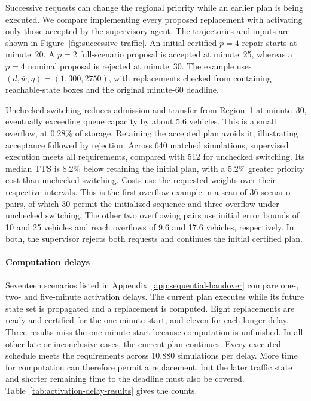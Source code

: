 \documentclass[final]{cas-sc}
\theoremstyle{definition}
\theoremstyle{plain}
\theoremstyle{definition}
\theoremstyle{plain}
\newcommand{\appref}[1]{Appendix~\ref{#1}}
\begin{document}
Successive requests can change the regional priority while an earlier
plan is being executed. We compare implementing every proposed
replacement with activating only those accepted by the supervisory
agent. The trajectories and inputs are shown in
Figure~\ref{fig:successive-traffic}.
An initial
certified $p=4$ repair starts at minute~20. A $p=2$ full-scenario
proposal is accepted at minute~25, whereas a $p=4$ nominal proposal
is rejected at minute~30. The example uses
$(d,\bar w,\eta)=(1,300,2750)$, with replacements checked from
containing reachable-state boxes and the original minute-60 deadline.

Unchecked switching reduces admission and transfer from Region~1 at
minute~30, eventually exceeding queue capacity by about 5.6 vehicles.
This is a small overflow, at 0.28\% of storage. Retaining the accepted
plan avoids it, illustrating acceptance followed by rejection. Across 640 matched
simulations, supervised execution meets all requirements, compared with
512 for unchecked switching. Its median TTS is 8.2\% below retaining
the initial plan, with a 5.2\% greater priority cost than unchecked
switching. Costs use the requested weights over their respective
intervals. This is the first overflow example in a scan of 36 scenario
pairs, of which 30 permit the initialized sequence and three overflow
under unchecked switching. The other two overflowing pairs use initial
error bounds of 10 and 25 vehicles and reach overflows of 9.6 and
17.6 vehicles, respectively. In both, the supervisor rejects both
requests and continues the initial certified plan.

\paragraph{Computation delays}
\label{sec:delayed-handover-results}
Seventeen scenarios listed in \appref{app:sequential-handover} compare
one-, two- and five-minute activation delays. The current plan executes
while its future state set is propagated and a replacement is computed.
Eight replacements are ready and certified for the one-minute start,
and eleven for each longer delay. Three results miss the one-minute
start because computation is unfinished. In all other late or
inconclusive cases, the current plan continues. Every executed schedule
meets the requirements across 10,880 simulations per delay. More time
for computation can therefore permit a replacement, but the later
traffic state and shorter remaining time to the deadline must also be
covered. Table~\ref{tab:activation-delay-results} gives the counts.
\end{document}
